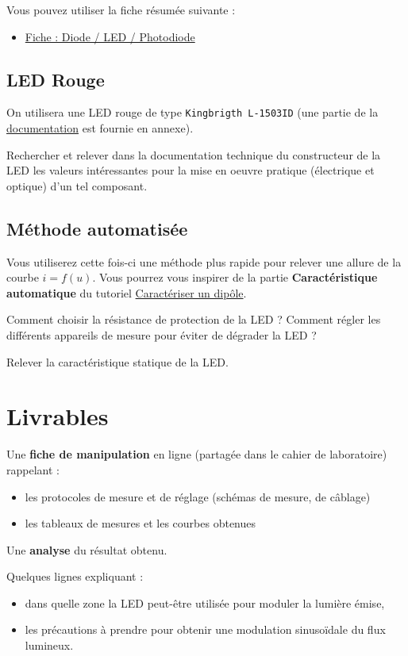 Vous pouvez utiliser la fiche résumée suivante : 

\begin{itemize}
	\item \hyperref[fiche:Led]{Fiche : Diode / LED / Photodiode}
\end{itemize}

\subsection{LED Rouge}

On utilisera une LED rouge de type \texttt{Kingbrigth L-1503ID} (une partie de la \hyperref[doc:ledRouge]{documentation} est fournie en annexe).

\Quest Rechercher et relever dans la documentation technique du constructeur de la LED les valeurs intéressantes pour la mise en oeuvre pratique (électrique et optique) d'un tel composant.

\subsection{Méthode automatisée}

Vous utiliserez cette fois-ci une méthode plus rapide pour relever une allure de la courbe $i = f(u)$. Vous pourrez vous inspirer de la partie \textbf{Caractéristique automatique} du tutoriel \hyperref[ressource:CaracStat]{Caractériser un dipôle}.

\Quest Comment choisir la résistance de protection de la LED ? Comment régler les différents appareils de mesure pour éviter de dégrader la LED ?

\Manip Relever la caractéristique statique de la LED.


\section{Livrables}


Une \textbf{fiche de manipulation} en ligne (partagée dans le cahier de laboratoire) rappelant :

\begin{itemize}
	\item les protocoles de mesure et de réglage (schémas de mesure, de câblage)
	\item les tableaux de mesures et les courbes obtenues
\end{itemize}

Une \textbf{analyse} du résultat obtenu.

Quelques lignes expliquant :

\begin{itemize}
	\item dans quelle zone la LED peut-être utilisée pour moduler la lumière émise,
	\item les précautions à prendre pour obtenir une modulation sinusoïdale du flux lumineux.
\end{itemize}

